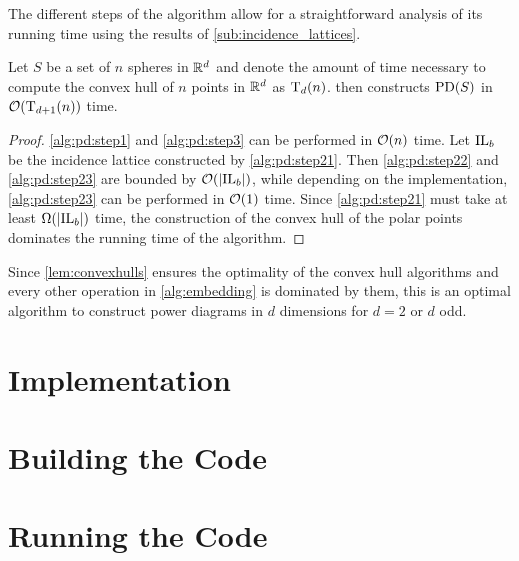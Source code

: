 The different steps of the algorithm allow for a straightforward analysis of its running time using the results of \cref{sub:incidence_lattices}.
\begin{theorem}
    Let $S$ be a set of $n$ spheres in $\mathbb{R}^d$ and denote the amount of time necessary to compute the convex hull of $n$ points in $\mathbb{R}^{d}$ as $\operatorname{T}_d(n)$.
     then constructs $\operatorname{PD}(S)$ in $\mathcal{O}(\operatorname{T}_{d+1}(n))$ time.
\end{theorem}
\begin{proof}
\ref{alg:pd:step1} and \ref{alg:pd:step3} can be performed in $\mathcal{O}(n)$ time.
Let $\operatorname{IL}_b$ be the incidence lattice constructed by \ref{alg:pd:step21}.
Then \ref{alg:pd:step22} and \ref{alg:pd:step23} are bounded by $\mathcal{O}(\left\vert \operatorname{IL}_b \right\vert)$, while depending on the implementation, \ref{alg:pd:step23} can be performed in $\mathcal{O}(1)$ time.
Since \ref{alg:pd:step21} must take at least $\Omega(\left\vert \operatorname{IL}_b \right\vert)$ time, the construction of the convex hull of the polar points dominates the running time of the algorithm.
\end{proof}

Since \cref{lem:convexhulls} ensures the optimality of the convex hull algorithms and every other operation in \cref{alg:embedding} is dominated by them, this is an optimal algorithm to construct power diagrams in $d$ dimensions for $d = 2$ or $d$ odd.

\section{Implementation}
\label{sec:implementation}

\appendix
\section{Building the Code}
\label{sec:building_the_code}

\section{Running the Code}
\label{sec:running_the_code}

\nocite{*}



